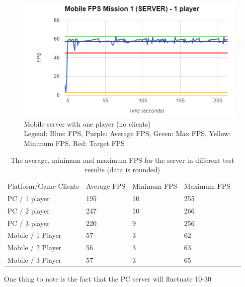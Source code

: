 \begin{figure}
    \includegraphics{figures/test/MobileServerOnePlayer}
    \caption{Mobile server with one player (no clients) \\ Legend: Blue: FPS, Purple: Average FPS, Green: Max FPS, Yellow: Minimum FPS, Red: Target FPS}
    \label{test:performance:mobileserverone}
\end{figure}

\begin{table}[h]
\begin{tabular}{lllll}\label{test:table:data}
Platform/Game Clients & Average FPS & Minimum FPS & Maximum FPS &  \\
PC / 1 player         & 195         & 10          & 255         &  \\
PC / 2 player         & 247         & 10          & 266         &  \\
PC / 3 player         & 220         & 9           & 256         &  \\
Mobile / 1 Player     & 57          & 3           & 62          &  \\
Mobile / 2 Player     & 56          & 3           & 63          &  \\
Mobile / 3 Player     & 57          & 3           & 65          & 
\end{tabular}
\caption{The average, minimum and maximum FPS for the server in different test results (data is rounded) }
\end{table}

One thing to note is the fact that the PC server will fluctuate 10-30%

